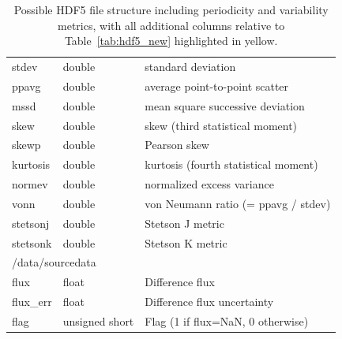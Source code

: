 \documentclass[12pt]{article}
\begin{document}
\begin{table}[ht!]
\begin{tabular}{ |p{3.5cm}p{2.5cm}p{9cm}| }
 \rowcolor{LightGoldenrodYellow}
 \hspace{1.0cm}stdev         &   double          &   standard deviation \\
 \rowcolor{LightGoldenrodYellow}
 \hspace{1.0cm}ppavg         &   double          &   average point-to-point scatter \\
 \rowcolor{LightGoldenrodYellow}
 \hspace{1.0cm}mssd          &   double          &   mean square successive deviation \\
 \rowcolor{LightGoldenrodYellow}
 \hspace{1.0cm}skew          &   double          &   skew (third statistical moment) \\
 \rowcolor{LightGoldenrodYellow}
 \hspace{1.0cm}skewp         &   double          &   Pearson skew \\
 \rowcolor{LightGoldenrodYellow}
 \hspace{1.0cm}kurtosis      &   double          &   kurtosis (fourth statistical moment) \\
 \rowcolor{LightGoldenrodYellow}
 \hspace{1.0cm}normev        &   double          &   normalized excess variance \\
 \rowcolor{LightGoldenrodYellow}
 \hspace{1.0cm}vonn          &   double          &   von Neumann ratio (= ppavg / stdev) \\
 \rowcolor{LightGoldenrodYellow}
 \hspace{1.0cm}stetsonj      &   double          &   Stetson J metric \\
 \rowcolor{LightGoldenrodYellow}
 \hspace{1.0cm}stetsonk      &   double          &   Stetson K metric \\
 \hline
 \multicolumn{3}{|l|}{\hspace{0.5cm}/data/sourcedata} \\
 \hspace{1.0cm}flux       &   float           &   Difference flux \\
 \hspace{1.0cm}flux\_err  &   float           &   Difference flux uncertainty \\
 \hspace{1.0cm}flag       &   unsigned short  &   Flag (1 if flux=NaN, 0 otherwise) \\
 \hline
\end{tabular}
\caption{\small Possible HDF5 file structure including periodicity and variability metrics, with all additional columns relative to Table~\ref{tab:hdf5_new} highlighted in yellow.}
\label{tab:hdf5_with_metrics}
\end{table}
\end{document}

